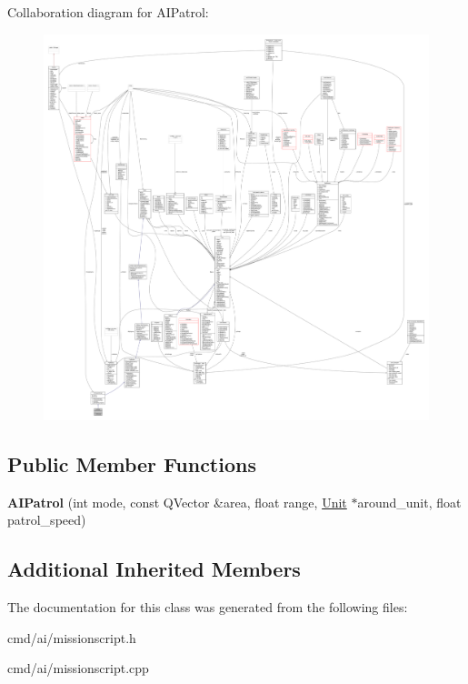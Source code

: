 Collaboration diagram for A\+I\+Patrol\+:
\nopagebreak
\begin{figure}[H]
\begin{center}
\leavevmode
\includegraphics[width=350pt]{db/d0c/classAIPatrol__coll__graph}
\end{center}
\end{figure}
\subsection*{Public Member Functions}
\begin{DoxyCompactItemize}
\item 
{\bfseries A\+I\+Patrol} (int mode, const Q\+Vector \&area, float range, \hyperlink{classUnit}{Unit} $\ast$around\+\_\+unit, float patrol\+\_\+speed)\hypertarget{classAIPatrol_a2a443173f5016a5043489b66046c336e}{}\label{classAIPatrol_a2a443173f5016a5043489b66046c336e}

\end{DoxyCompactItemize}
\subsection*{Additional Inherited Members}


The documentation for this class was generated from the following files\+:\begin{DoxyCompactItemize}
\item 
cmd/ai/missionscript.\+h\item 
cmd/ai/missionscript.\+cpp\end{DoxyCompactItemize}
